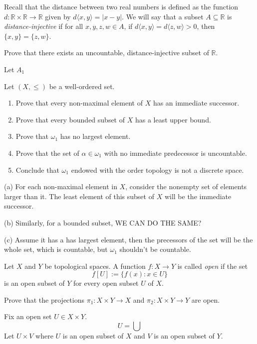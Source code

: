 \documentclass[../main.tex]{subfiles}
\begin{document}
\begin{problem}[8]
Recall that the distance between two real numbers is defined as the function $d: \mathbb{R} \times \mathbb{R} \to \mathbb{R}$ given by $d\langle x, y \rangle = |x - y|$.
We will say that a subset $A \subseteq \mathbb{R}$ is \textit{distance-injective} if for all $x, y, z, w \in A$, if $d\langle x, y \rangle = d\langle z, w \rangle > 0$, then $\{ x, y \} = \{z, w \}$.

Prove that there exists an uncountable, distance-injective subset of $\mathbb{R}$.
\end{problem}
Let $A_1$

\begin{problem}[9]
Let $(X, \le)$ be a well-ordered set.
\begin{enumerate}[label=(\alph*)]
	\item Prove that every non-maximal element of $X$ has an immediate successor.
	\item Prove that every bounded subset of $X$ has a least upper bound.
	\item Prove that $\omega_1$ has no largest element.
	\item Prove that the set of $\alpha \in \omega_1$ with no immediate predecessor is uncountable.
	\item Conclude that $\omega_1$ endowed with the order topology is not a discrete space.
\end{enumerate}
\end{problem}

(a) For each non-maximal
element in $X$, consider the nonempty set of elements larger than it.
The least element of this subset of $X$ will be the immediate successor.

(b) Similarly, for a bounded subset, WE CAN DO THE SAME?

(c) Assume it has a has largest element, then the precessors of the set will be the whole set, which is countable, but $\omega_1$ shouldn't be countable.

\begin{problem}[10]
Let $X$ and $Y$ be topological spaces.
A function $f : X \to Y$ is called \textit{open} if the set
\[
	f[U] := \{ f(x) : x \in U \}
\]
is an open subset of $Y$ for every open subset $U$ of $X$.

Prove that the projections $\pi_1 : X \times Y \to X$ and $\pi_2 : X \times Y \to Y$ are open.
\end{problem}
Fix an open set $U \in X \times Y$.
\[
	U = \bigcup
\]
Let $U \times V$ where $U$ is an open subset of $X$ and $V$ is an open subset of $Y$.
\end{document}
